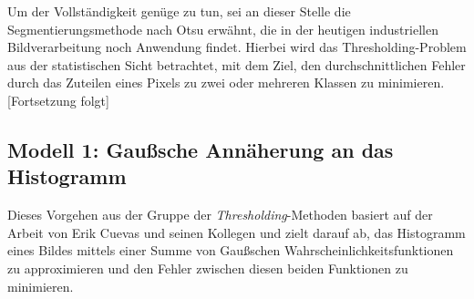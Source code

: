 		Um der Vollständigkeit genüge zu tun, sei an dieser Stelle die Segmentierungsmethode nach Otsu erwähnt, die in der heutigen industriellen Bildverarbeitung noch Anwendung findet. Hierbei wird das Thresholding-Problem aus der statistischen Sicht betrachtet, mit dem Ziel, den durchschnittlichen Fehler durch das Zuteilen eines Pixels zu zwei oder mehreren Klassen zu minimieren. \color{red} [Fortsetzung folgt] \color{black}

		\subsection{Modell 1: Gaußsche Annäherung an das Histogramm}
		\label{sec:meth1}
			
			Dieses Vorgehen aus der Gruppe der \textit{Thresholding}-Methoden basiert auf der Arbeit von Erik Cuevas und seinen Kollegen \cite{cuevas-meth1} und zielt darauf ab, das Histogramm eines Bildes mittels einer Summe von Gaußschen Wahrscheinlichkeitsfunktionen zu approximieren und den Fehler zwischen diesen beiden Funktionen zu minimieren.
			
